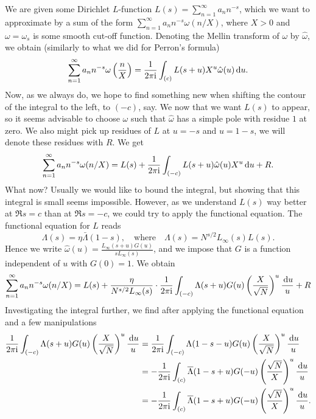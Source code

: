 \documentclass[a4paper,11pt]{article}
\begin{document}
We are given some Dirichlet $L$-function $L(s) = \sum_{n=1}^\infty a_n n^{-s}$,
which we want to approximate by a sum of the form 
$\sum_{n=1}^\infty a_n n^{-s} \omega(n/X)$, where $X>0$ and $\omega = \omega_s$
is some smooth cut-off function. Denoting the Mellin transform of $\omega$ by
$\hat \omega$, we obtain (similarly to what we did for Perron's formula)
\begin{equation}
    \sum_{n=1}^\infty a_n n^{-s} \omega\left(\frac nX \right) = \frac{1}{2 \pi \mathrm i} \int_{(c)} 
    L(s+u) X^u \hat \omega(u)  \mathrm{\,d} u.
\end{equation}
Now, as we always do, we hope to find something new when shifting the contour 
of the integral to the left, to $(-c)$, say. We now that we want $L(s)$ to appear,
so it seems advisable to choose $\omega$ such that $\hat \omega$ has a simple
pole with residue $1$ at zero. We also might pick up residues of $L$ at 
$u = -s$ and $u = 1-s$, we will denote these residues with $R$. We get
\[
    \sum_{n=1}^\infty a_n n^{-s} \omega(n/X) = 
    L(s) + \frac{1}{2 \pi \mathrm i} \int_{(-c)} L(s+u) \hat \omega(u) X^u \mathrm{\,d} u + R.
\]
What now? Usually we would like to bound the integral, but showing that this integral
is small seems impossible. However, as we understand $L(s)$ way better at 
$\Re s = c$ than at $\Re s = -c$, we could try to apply the functional equation.
The functional equation for $L$ reads
\[
    \Lambda(s) = \eta \bar \Lambda(1-s), \quad \text{where} \quad \Lambda(s) = 
    N^{s/2} L_\infty(s) L(s). 
\]
Hence we write $\hat \omega(u) = \frac{L_\infty(s+u) G(u)}{s L_\infty(s)}$, and we
impose that $G$ is a function independent of $u$ with $G(0) =1$. We obtain 
\begin{equation}
\sum_{n=1}^\infty a_n n^{-s} \omega(n/X)  = 
L(s) + \frac{\eta}{N^{s/2} L_\infty(s)} \cdot \frac1 {2\pi \mathrm i} 
\int_{(-c)} \Lambda(s+u) G(u) \left( \frac X{\sqrt N} \right)^u \frac {\mathrm{\,d} u} u + R
\end{equation} 
Investigating the integral further, we find after applying the functional equation 
and a few manipulations
\[
\begin{aligned}
    \frac{1}{2 \pi \mathrm i} \int_{(-c)} \Lambda(s+u) G(u) \left( \frac X{\sqrt N} \right)^u
    \frac {\mathrm{\,d} u} u 
    &=  \frac{1}{2 \pi \mathrm i} \int_{(-c)} \Lambda(1-s-u) G(u) \left( \frac X{\sqrt N} \right)^u \frac {\mathrm{\,d} u} u \\
    &=  -\frac{1}{2 \pi \mathrm i} \int_{(c)} \overline \Lambda(1-s+u) G(-u) \left( \frac {\sqrt N}X \right)^u \frac {\mathrm{\,d} u} u \\
    &=  -\frac{1}{2 \pi \mathrm i} \int_{(c)} \overline \Lambda(1-s+u) G(-u) \left( \frac {\sqrt N}X \right)^u \frac {\mathrm{\,d} u} u. 
\end{aligned}
\]
\end{document}
